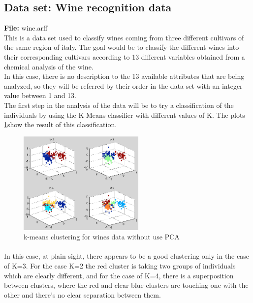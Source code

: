 \documentclass[12pt, a4paper]{article}
\begin{document}
\subsection{Data set: Wine recognition data} %
\label{sub:data_set_wine_recognition_data}
\textbf{File:} wine.arff\\

This is a data set used to classify wines coming from three different cultivars of the same region of italy. The goal would be to classify the different wines into their corresponding cultivars according to 13 different variables obtained from a chemical analysis of the wine.\\

In this case, there is no description to the 13 available attributes that are being analyzed, so they will be referred by their order in the data set with an integer value between 1 and 13.\\

The first step in the analysis of the data will be to try a classification of the individuals by using the K-Means classifier with different values of K. The plots \ref{fig:Wine_1}show the result of this classification.
\begin{figure}[ht!]
	\centering
	\includegraphics[width=0.55\textwidth]{img/Wines_1}
	\caption{k-means clustering for wines data without use PCA}
	\label{fig:Wine_1}
\end{figure}
\paragraph{}In this case, at plain sight, there appears to be a good clustering only in the case of K=3. For the case K=2  the red cluster is taking two groups of individuals which are clearly different, and for the case of K=4, there is a superposition between clusters, where the red and clear blue clusters are touching one with the other and there's no clear separation between them.\\
\end{document}
